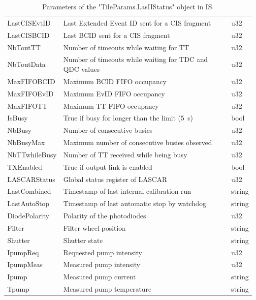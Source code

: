 \begin{table}[htbp]
\begin{center}
\begin{tabular}{lll}
      LastCISEvtID & Last Extended Event ID sent for a CIS fragment & u32 \\
      LastCISBCID & Last BCID sent for a CIS fragment & u32 \\
      NbToutTT & Number of timeouts while waiting for TT & u32 \\
      NbToutData & Number of timeouts while waiting for TDC and QDC values & u32 \\
      MaxFIFOBCID & Maximum BCID FIFO occupancy & u32 \\
      MaxFIFOEvID & Maximum EvID FIFO occupancy & u32 \\
      MaxFIFOTT & Maximum TT FIFO occupancy & u32 \\
      IsBusy & True if busy for longer than the limit (5~s) & bool \\
      NbBusy & Number of consecutive busies & u32 \\
      NbBusyMax & Maximum number of consecutive busies observed & u32 \\
      NbTTwhileBusy & Number of TT received while being busy & u32 \\
      TXEnabled & True if output link is enabled & bool \\
      LASCARStatus & Global status register of LASCAR & u32 \\
      LastCombined & Timestamp of last internal calibration run & string \\
      LastAutoStop & Timestamp of last automatic stop by watchdog & string \\
      DiodePolarity & Polarity of the photodiodes & u32 \\
      Filter & Filter wheel position & string \\
      Shutter & Shutter state & string \\
      IpumpReq & Requested \las{} pump intensity & u32 \\
      IpumpMeas & Measured \las{} pump intensity & u32 \\
      Ipump & Measured \las{} pump current & string \\
      Tpump & Measured \las{} pump temperature & string \\
      \hline
    \end{tabular}
   \caption{Parameters of the "TileParams.LasIIStatus" object in IS.}\label{tab:IS:lasIIstatus}
  \end{center}
\end{table}

\newpage

